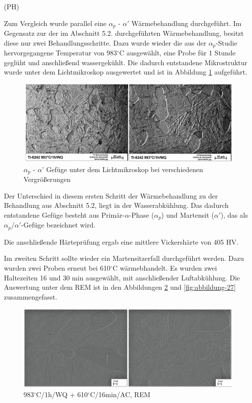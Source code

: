 (PH)

Zum Vergleich wurde parallel eine $\alpha_p$ - $\alpha'$ Wärmebehandlung durchgeführt. Im Gegensatz zur der im Abschnitt 5.2. durchgeführten Wärmebehandlung, besitzt diese nur zwei Behandlungsschritte.
Dazu wurde wieder die aus der $\alpha_p$-Studie hervorgegangene Temperatur von 983$^\circ$C ausgewählt, eine Probe für 1 Stunde geglüht und anschließend wassergekühlt. Die dadurch entstandene Mikrostruktur wurde unter dem Lichtmikroskop ausgewertet und ist in Abbildung \ref{fig:abbildung-19} aufgeführt.

\begin{figure}
	\centering
	\includegraphics[width=0.9\linewidth]{./Bilder/Abbildung 19}
	\caption[Abbildung 19]{$\alpha_p$ - $\alpha$' Gefüge unter dem Lichtmikroskop bei verschiedenen Vergrößerungen}
	\label{fig:abbildung-19}
\end{figure}

Der Unterschied in diesem ersten Schritt der Wärmebehandlung zu der Behandlung aus Abschnitt 5.2, liegt in der Wasserabkühlung. Das dadurch entstandene Gefüge besteht aus Primär-$\alpha$-Phase ($\alpha_p$) und Martensit ($\alpha'$), das als $\alpha_p$/$\alpha'$-Gefüge bezeichnet wird.

Die anschließende Härteprüfung ergab eine mittlere Vickershärte von 405 HV.

Im zweiten Schritt sollte wieder ein Martensitzerfall durchgeführt werden. Dazu wurden zwei Proben erneut bei 610$^\circ$C wärmebhandelt. Es wurden zwei Haltezeiten 16 und 30 min ausgewählt, mit anschließender Luftabkühlung. Die Auswertung unter dem REM ist in den Abbildungen \ref{fig:abbildung-26} und \ref{fig:abbildung-27} zusammengefasst.

\begin{figure}
	\centering
	\includegraphics[width=1.0\linewidth]{./Bilder/Abbildung 26.png}
	\caption[Abbildung 26]{983$^\circ$C/1h/WQ + 610$^\circ$C/16min/AC, REM}
	\label{fig:abbildung-26}
\end{figure}


